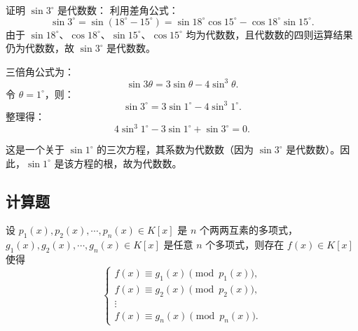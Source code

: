 \documentclass[lang=cn,12pt]{elegantbook}
\begin{document}
\begin{solution}
    证明 $\sin 3^\circ$ 是代数数：
    利用差角公式：
    \[
    \sin 3^\circ = \sin(18^\circ - 15^\circ) = \sin 18^\circ \cos 15^\circ - \cos 18^\circ \sin 15^\circ.
    \]
    由于 $\sin 18^\circ$、$\cos 18^\circ$、$\sin 15^\circ$、$\cos 15^\circ$ 均为代数数，且代数数的四则运算结果仍为代数数，故 $\sin 3^\circ$ 是代数数。
    
    三倍角公式为：
    \[
    \sin 3\theta = 3 \sin \theta - 4 \sin^3 \theta.
    \]
    令 $\theta = 1^\circ$，则：
    \[
    \sin 3^\circ = 3 \sin 1^\circ - 4 \sin^3 1^\circ.
    \]
    整理得：
    \[
    4 \sin^3 1^\circ - 3 \sin 1^\circ + \sin 3^\circ = 0.
    \]
    
    这是一个关于 $\sin 1^\circ$ 的三次方程，其系数为代数数（因为 $\sin 3^\circ$ 是代数数）。因此，$\sin 1^\circ$ 是该方程的根，故为代数数。
\end{solution}

\subsection{计算题}

\begin{example}
设 \( p_1(x), p_2(x), \cdots, p_n(x) \in K[x] \) 是 \( n \) 个两两互素的多项式，\( g_1(x), g_2(x), \cdots, g_n(x) \in K[x] \) 是任意 \( n \) 个多项式，则存在 \( f(x) \in K[x] \) 使得
\[
\begin{cases}
f(x) \equiv g_1(x) \pmod{p_1(x)}, \\
f(x) \equiv g_2(x) \pmod{p_2(x)}, \\
\vdots \\
f(x) \equiv g_n(x) \pmod{p_n(x)}.
\end{cases}
\]
\end{example}
\end{document}
